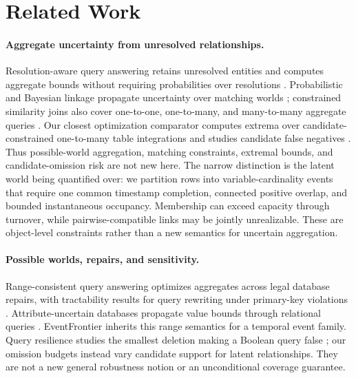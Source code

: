 \section{Related Work}
\label{sec:related}

\paragraph{Aggregate uncertainty from unresolved relationships.}
Resolution-aware query answering retains unresolved entities and computes
aggregate bounds without requiring probabilities over resolutions
\citep{sismanis2009resolution}. Probabilistic and Bayesian linkage propagate
uncertainty over matching worlds \citep{hua2012aggregate,sadinle2017linkage};
constrained similarity joins also cover one-to-one, one-to-many, and
many-to-many aggregate queries \citep{chen2019constrained}. Our closest
optimization comparator computes extrema over candidate-constrained
one-to-many table integrations and studies candidate false negatives
\citep{turkcapar2023aggregate}. Thus possible-world aggregation, matching
constraints, extremal bounds, and candidate-omission risk are not new here.
The narrow distinction is the latent world being quantified over: we partition
rows into variable-cardinality events that require one common timestamp
completion, connected positive overlap, and bounded instantaneous occupancy.
Membership can exceed capacity through turnover, while pairwise-compatible
links may be jointly unrealizable. These are object-level constraints rather
than a new semantics for uncertain aggregation.

\paragraph{Possible worlds, repairs, and sensitivity.}
Range-consistent query answering optimizes aggregates across legal database
repairs, with tractability results for query rewriting under primary-key
violations \citep{elkhalfioui2024range,elkhalfioui2026upper}.
Attribute-uncertain databases propagate value bounds through relational
queries \citep{feng2021audb}. EventFrontier inherits this range semantics for a
temporal event family. Query resilience studies the smallest deletion making a
Boolean query false \citep{freire2015resilience}; our omission budgets instead
vary candidate support for latent relationships. They are not a new general
robustness notion or an unconditional coverage guarantee.


